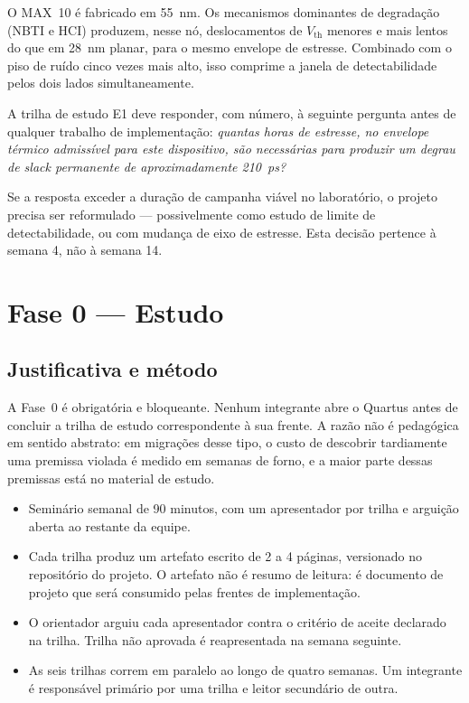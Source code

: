\documentclass[11pt,a4paper]{article}
\newcommand{\campo}[1]{\vspace{6pt}\noindent{\bfseries\color{lescgray}#1}\par\vspace{2pt}}
\begin{document}
O MAX~10 é fabricado em \SI{55}{\nano\meter}. Os mecanismos dominantes de degradação
(NBTI e HCI) produzem, nesse nó, deslocamentos de $V_\text{th}$ menores e mais lentos
do que em \SI{28}{\nano\meter} planar, para o mesmo envelope de estresse. Combinado com
o piso de ruído cinco vezes mais alto, isso comprime a janela de detectabilidade pelos
dois lados simultaneamente.

\begin{warnbox}[title={Verificação de viabilidade obrigatória na semana 4}]
A trilha de estudo E1 deve responder, com número, à seguinte pergunta antes de qualquer
trabalho de implementação: \emph{quantas horas de estresse, no envelope térmico
admissível para este dispositivo, são necessárias para produzir um degrau de
\emph{slack} permanente de aproximadamente \SI{210}{\pico\second}?}

Se a resposta exceder a duração de campanha viável no laboratório, o projeto precisa
ser reformulado --- possivelmente como estudo de limite de detectabilidade, ou com
mudança de eixo de estresse. Esta decisão pertence à semana 4, não à semana 14.
\end{warnbox}

\section{Fase 0 --- Estudo}

\subsection{Justificativa e método}
\label{sec:fase0-metodo}

A Fase~0 é obrigatória e bloqueante. Nenhum integrante abre o Quartus antes de concluir
a trilha de estudo correspondente à sua frente. A razão não é pedagógica em sentido
abstrato: em migrações desse tipo, o custo de descobrir tardiamente uma premissa
violada é medido em semanas de forno, e a maior parte dessas premissas está no
material de estudo.

\campo{Formato operacional}
\begin{itemize}
  \item Seminário semanal de 90 minutos, com um apresentador por trilha e arguição
        aberta ao restante da equipe.
  \item Cada trilha produz um artefato escrito de 2 a 4 páginas, versionado no
        repositório do projeto. O artefato não é resumo de leitura: é documento
        de projeto que será consumido pelas frentes de implementação.
  \item O orientador arguiu cada apresentador contra o critério de aceite declarado
        na trilha. Trilha não aprovada é reapresentada na semana seguinte.
  \item As seis trilhas correm em paralelo ao longo de quatro semanas. Um integrante
        é responsável primário por uma trilha e leitor secundário de outra.
\end{itemize}
\end{document}
